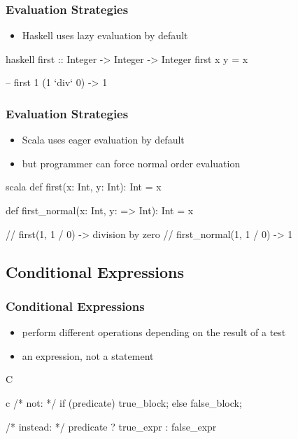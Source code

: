 \documentclass[dvipsnames]{beamer}
\theoremstyle{plain}
\begin{document}
\begin{frame}[fragile]
  \frametitle{Evaluation Strategies}

  \begin{itemize}
    \item Haskell uses lazy evaluation by default
  \end{itemize}

  \begin{example}[Haskell]
    \begin{pygments}{haskell}
first :: Integer -> Integer -> Integer
first x y = x

-- first 1 (1 `div` 0) -> 1
    \end{pygments}
  \end{example}
\end{frame}

\begin{frame}[fragile]
  \frametitle{Evaluation Strategies}

  \begin{itemize}
    \item Scala uses eager evaluation by default
    \item but programmer can force normal order evaluation
  \end{itemize}

  \begin{example}[Scala]
    \begin{pygments}{scala}
def first(x: Int, y: Int): Int = x

def first_normal(x: Int, y: => Int): Int = x

// first(1, 1 / 0) -> division by zero
// first_normal(1, 1 / 0) -> 1
    \end{pygments}
  \end{example}
\end{frame}

\subsection{Conditional Expressions}

\begin{frame}[fragile]
  \frametitle{Conditional Expressions}

  \begin{itemize}
    \item perform different operations depending on the result of a test
    \item an expression, not a statement
  \end{itemize}

  \pause
  \begin{block}{C}
    \begin{pygments}{c}
/* not: */
if (predicate)
    true_block;
else
    false_block;

/* instead: */
predicate ? true_expr : false_expr
    \end{pygments}
  \end{block}
\end{frame}
\end{document}
